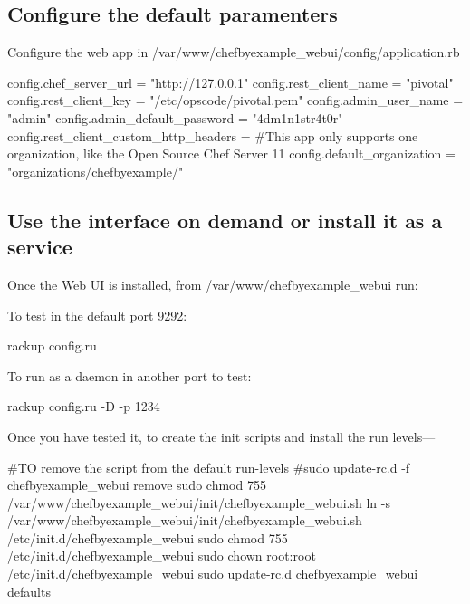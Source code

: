 \subsection{Configure the default paramenters}

Configure the web app in /var/www/chefbyexample\_webui/config/application.rb

\begin{codelisting}
\label{code:}
\codecaption{}
\begin{code}
config.chef_server_url = "http://127.0.0.1"
config.rest_client_name = "pivotal"
config.rest_client_key = "/etc/opscode/pivotal.pem"
config.admin_user_name =  "admin"
config.admin_default_password = "4dm1n1str4t0r"
config.rest_client_custom_http_headers = {}
#This app only supports one organization, like the Open Source Chef Server 11
config.default_organization = "organizations/chefbyexample/"
\end{code}
\end{codelisting}

\subsection{Use the interface on demand or install it as a service}

Once the Web UI is installed, from /var/www/chefbyexample\_webui run:

To test in the default port 9292:
\begin{codelisting}
\label{code:}
\codecaption{}
\begin{code}
rackup config.ru
\end{code}
\end{codelisting}

To run as a daemon in another port to test:
\begin{codelisting}
\label{code:}
\codecaption{}
\begin{code}
rackup config.ru -D -p 1234
\end{code}
\end{codelisting}

Once you have tested it, to create the init scripts and install the run levels---
\begin{codelisting}
\label{code:}
\codecaption{}
\begin{code}
#TO remove the script from the default run-levels
#sudo update-rc.d -f chefbyexample_webui remove
sudo chmod 755 /var/www/chefbyexample_webui/init/chefbyexample_webui.sh
ln -s /var/www/chefbyexample_webui/init/chefbyexample_webui.sh /etc/init.d/chefbyexample_webui
sudo chmod 755 /etc/init.d/chefbyexample_webui
sudo chown root:root /etc/init.d/chefbyexample_webui
sudo update-rc.d chefbyexample_webui defaults
\end{code}
\end{codelisting}